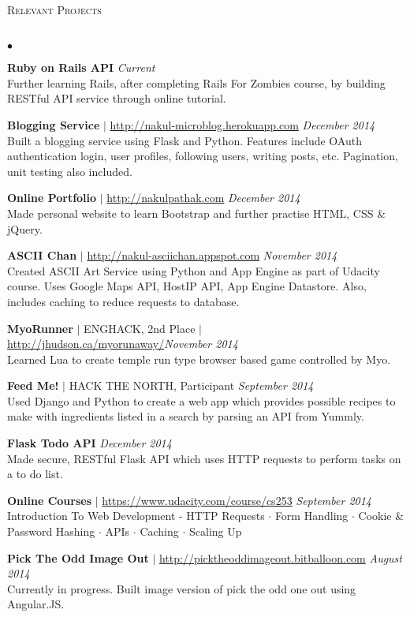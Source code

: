 \documentclass[10pt]{article}
\newcommand{\lineunder}{\vspace*{-8pt} \\ \hspace*{-18pt} \hrulefill \\}
\newcommand{\header}[1]{{\hspace*{-15pt}\vspace*{6pt} \textsc{#1}} \vspace*{-6pt} \lineunder}
\newenvironment{achievements}{\begin{list}{$\bullet$}{\topsep 0pt \itemsep -1.5pt \leftmargin 5pt}}{\vspace*{4pt}\end{list}}
\begin{document}
\header{\normalsize Relevant Projects}
\begin{achievements}
\def\UrlFont{\em}
\item \textbf{Ruby on Rails API} \hfill \textit {Current}
\\ Further learning Rails, after completing Rails For Zombies course, by building RESTful API service through online tutorial.
\item \textbf{Blogging Service} $|$ \url{http://nakul-microblog.herokuapp.com} \hfill \textit {December 2014}
\\ Built a blogging service using Flask and Python. Features include OAuth authentication login, user profiles, following users, writing posts, etc. Pagination, unit testing also included.
\item \textbf{Online Portfolio} $|$  \url{http://nakulpathak.com} \hfill \textit {December 2014}
\\ Made personal website to learn Bootstrap and further practise HTML, CSS \& jQuery.
\item \textbf{ASCII Chan}  $|$ \url{http://nakul-asciichan.appspot.com} \hfill \textit {November 2014}
\\ Created ASCII Art Service using Python and App Engine as part of Udacity course. Uses Google Maps API, HostIP API, App Engine Datastore. Also, includes caching to reduce requests to database. 
\item\textbf{MyoRunner}  {$|$ \scriptsize ENGHACK, 2nd Place $|$ }  \url{http://jhudson.ca/myorunaway/}\hfill \textit {November 2014}
\\ Learned Lua to create temple run type browser based game controlled by Myo.
\item \textbf{Feed Me!} {$|$ \scriptsize HACK THE NORTH, Participant}  \hfill \textit {September 2014}
\\ Used Django and Python to create a web app which provides possible recipes to make with ingredients listed in a search by parsing an API from Yummly.
\item \textbf{Flask Todo API}  \hfill \textit {December 2014}
\\ Made secure, RESTful Flask API which uses HTTP requests to perform tasks on a to do list.
\item \textbf{Online Courses} $|$ \url{https://www.udacity.com/course/cs253} \hfill \textit {September 2014}
\\ Introduction To Web Development - HTTP Requests  $\cdot$ Form Handling $\cdot$ Cookie \& Password Hashing $\cdot$ APIs $\cdot$ Caching $\cdot$ Scaling Up
\item \textbf{Pick The Odd Image Out} $|$ \url{http://picktheoddimageout.bitballoon.com} \hfill \textit{August 2014}
\\ Currently in progress. Built image version of pick the odd one out using Angular.JS. 
\end{achievements}
\end{document}
